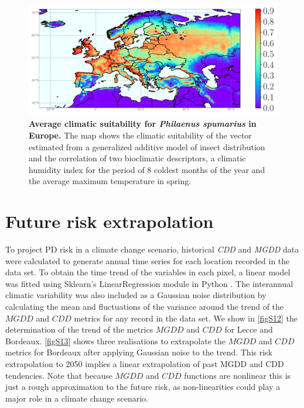 \begin{figure}[H]
    \centering
    \includegraphics[width=1\textwidth]{Figures/vector_layer.png}
    \caption{\textbf{Average climatic suitability for \textit{Philaenus
                spumarius} in Europe.} The map shows the climatic suitability
        of the vector
        estimated from a generalized additive model of insect distribution and
        the
        correlation of two bioclimatic descriptors, a climatic humidity index
        for the
        period of 8 coldest months of the year and the average maximum
        temperature in
        spring.}
    \label{fig:sup_vector} %
\end{figure}

\section{Future risk extrapolation}\label{app:future}

To project PD risk in a climate change scenario, historical \textit{CDD}
and \textit{MGDD} data were calculated to generate annual time series for each
location recorded in the data set. To obtain the time trend of the variables in
each pixel, a linear model was fitted using Sklearn's LinearRegression module
in Python \cite{scikit-learn}. The interannual climatic variability was also
included as a Gaussian noise distribution by calculating the mean and
fluctuations of the variance around the trend of the $MGDD$ and $CDD$ metrics
for any record in the data set. We show in \cref{figS12} the determination of
the trend of the metrics $MGDD$ and $CDD$ for Lecce and Bordeaux. \cref{figS13}
shows three realisations to extrapolate the $MGDD$ and $CDD$ metrics for
Bordeaux after applying Gaussian noise to the trend. This risk extrapolation to
2050 implies a linear extrapolation of past MGDD and CDD tendencies. Note that
because $MGDD$ and $CDD$ functions are nonlinear this is just a rough
approximation to the future risk, as non-linearities could play a major role in
a climate change scenario.

